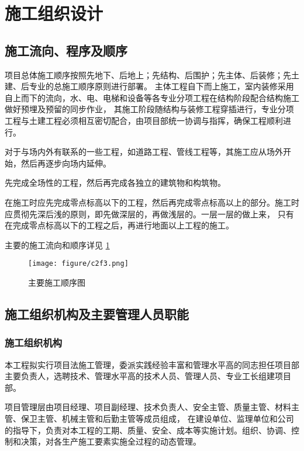 \section{施工组织设计}
\subsection{施工流向、程序及顺序}

\setlength{\baselineskip}{20pt}
项目总体施工顺序按照先地下、后地上；先结构、后围护；先主体、后装修；先土建、后专业的总施工顺序原则进行部署。
主体工程自下而上施工，室内装修采用自上而下的流向，水、电、电梯和设备等各专业分项工程在结构阶段配合结构施工做好预埋及预留的同步作业，
其施工阶段随结构与装修工程穿插进行，专业分项工程与土建工程必须相互密切配合，由项目部统一协调与指挥，确保工程顺利进行。

对于与场内外有联系的一些工程，如道路工程、管线工程等，其施工应从场外开始，然后再逐步向场内延伸。

先完成全场性的工程，然后再完成各独立的建筑物和构筑物。

在施工时应先完成零点标高以下的工程，然后再完成零点标高以上的部分。施工时应贯彻先深后浅的原则，即先做深层的，再做浅层的。一层一层的做上来，
只有在完成零点标高以下的工程之后，再进行地面以上工程的施工。

主要的施工流向和顺序详见 \ref{fig:c2f3}

\begin{figure}[thbp!]
    \centering
    \texttt{[image: figure/c2f3.png]}
    \caption{主要施工顺序图}
    \label{fig:c2f3}
\end{figure}

\subsection{施工组织机构及主要管理人员职能}
\subsubsection{施工组织机构}

本工程拟实行项目法施工管理，委派实践经验丰富和管理水平高的同志担任项目部主要负责人，选聘技术、管理水平高的技术人员、管理人员、专业工长组建项目部。

项目管理层由项目经理、项目副经理、技术负责人、安全主管、质量主管、材料主管、保卫主管、机械主管和后勤主管等成员组成，
在建设单位、监理单位和公司的指导下，负责对本工程的工期、质量、安全、成本等实施计划。组织、协调、控制和决策，对各生产施工要素实施全过程的动态管理。

